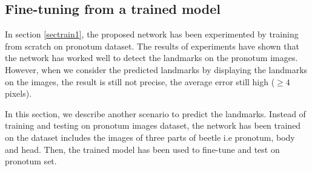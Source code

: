 \documentclass[10pt]{article}
\begin{document}
\subsection{Fine-tuning from a trained model}
\label{secimproving}
In section \ref{sectrain1}, the proposed network has been experimented by training from scratch on pronotum dataset. The results of experiments have shown that the network has worked well to detect the landmarks on the pronotum images. However, when we consider the predicted landmarks by displaying the landmarks on the images, the result is still not precise, the average error still high ($\geq 4$ pixels). 

In this section, we describe another scenario to predict the landmarks. Instead of training and testing on pronotum images dataset, the network has been trained on the dataset includes the images of three parts of beetle i.e pronotum, body and head. Then, the trained model has been used to fine-tune and test on pronotum set.



\end{document}

